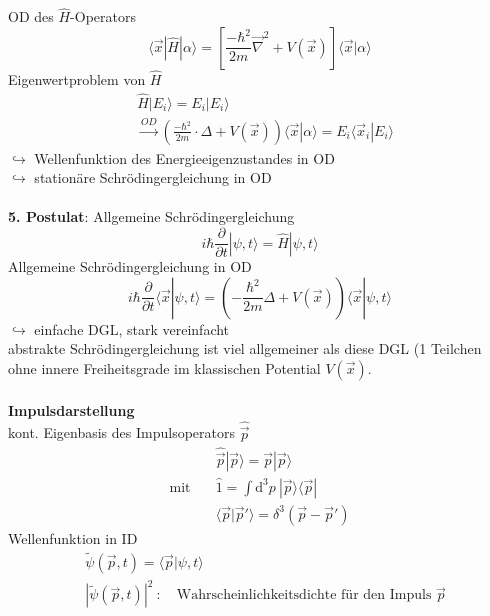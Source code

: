 \documentclass[10pt,article,colorback,accentcolor=tud9d]{scrartcl}
\begin{document}
OD des $\hat{H}$-Operators 
\begin{equation}
\langle\vec{x}|\hat{H}|\alpha\rangle=\left[\frac{-\hbar^2}{2m}\vec{\nabla}^2+V(\vec{x})\right]\langle\vec{x}|\alpha\rangle
\label{eq:Hamiltonoperator Ortsdarstellung}
\end{equation}
Eigenwertproblem von $\hat{H}$
\begin{align}
&\hat{H}|E_i\rangle=E_i|E_i\rangle\nonumber\\
&\xrightarrow{OD}\left(\frac{-\hbar^2}{2m}\cdot \Delta+V(\vec{x})\right)\langle\vec{x}|\alpha\rangle=E_i\langle\vec{x}_i|E_i\rangle
\end{align}
$\hookrightarrow$ Wellenfunktion des Energieeigenzustandes in OD\\
$\hookrightarrow$ stationäre Schrödingergleichung in OD\\\\
\textbf{5. Postulat}: Allgemeine Schrödingergleichung
\begin{equation}
i\hbar\frac{\partial}{\partial t}|\psi,t\rangle=\hat{H}|\psi,t\rangle
\label{eq:Allgemeine Schrödingergleichung}
\end{equation}
Allgemeine Schrödingergleichung in OD
\begin{equation}
i\hbar\frac{\partial}{\partial t}\langle\vec{x}|\psi,t\rangle=\left(-\frac{\hbar^2}{2m} \Delta+V(\vec{x})\right)\langle\vec{x}|\psi,t\rangle
\label{eq:Allgemeine Schrödingergleichung in OD}
\end{equation}
$\hookrightarrow$ einfache DGL, stark vereinfacht\\
abstrakte Schrödingergleichung ist viel allgemeiner als diese DGL (1 Teilchen ohne innere Freiheitsgrade im klassischen Potential $V(\vec{x})$.\\\\
\textbf{Impulsdarstellung}\\
kont. Eigenbasis des Impulsoperators $\hat{\vec{p}}$\\
\begin{align}
&\hat{\vec{p}}|\vec{p}\rangle=\vec{p}|\vec{p}\rangle\\
\text{mit} \quad &\hat{1}=\int \mathrm{d}^3p\ |\vec{p}\rangle\langle\vec{p}|\\
&\langle\vec{p}|\vec{p}'\rangle=\delta^3(\vec{p}-\vec{p}')
\end{align}
Wellenfunktion in ID
\begin{align}
&\tilde{\psi}(\vec{p},t)=\langle\vec{p}|\psi,t\rangle\\
&\left|\tilde{\psi}(\vec{p},t)\right|^2\ : \quad \text{Wahrscheinlichkeitsdichte für den Impuls $\vec{p}$}
\end{align}
\end{document}
